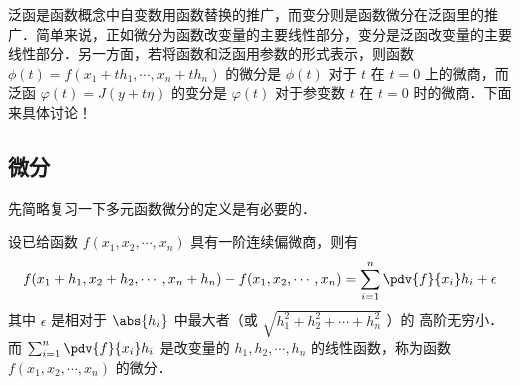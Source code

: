 
泛函是函数概念中自变数用函数替换的推广，而变分则是函数微分在泛函里的推广．简单来说，正如微分为函数改变量的主要线性部分，变分是泛函改变量的主要线性部分．另一方面，若将函数和泛函用参数的形式表示，则函数$\phi(t)=f(x_1+th_1,\cdots,x_n+th_n) $ 的微分是 $\phi(t)$ 对于 $t$ 在 $t=0$ 上的微商，而泛函 $\varphi(t)=J(y+t\eta)$ 的变分是 $\varphi(t)$ 对于参变数 $t$ 在 $t=0$ 时的微商．下面来具体讨论！
\subsection{微分}
先简略复习一下多元函数微分的定义是有必要的．

设已给函数 $f(x_1,x_2,\cdots,x_n)$ 具有一阶连续偏微商，则有
\begin{equation}
f(x_1+h_1,x_2+h_2,\cdots,x_n+h_n)-f(x_1,x_2,\cdots,x_n)=\sum_{i=1}^{n} \pdv{f}{x_i}h_i+\epsilon
\end{equation}
其中 $\epsilon$ 是相对于 $\abs{h_i}$ 中最大者（或 $\sqrt{h_1^2+h_2^2+\cdots+h_n^2}$ ）的 高阶无穷小．而 $\sum_{i=1}^{n} \pdv{f}{x_i}h_i$ 是改变量的 $h_1,h_2,\cdots,h_n$ 的线性函数，称为函数 $f(x_1,x_2,\cdots,x_n)$ 的微分．